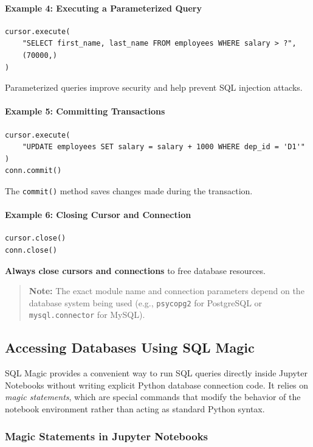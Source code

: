 \documentclass{article}
\begin{document}
\paragraph{Example 4: Executing a Parameterized Query}
\begin{verbatim}
cursor.execute(
    "SELECT first_name, last_name FROM employees WHERE salary > ?",
    (70000,)
)
\end{verbatim}
Parameterized queries improve security and help prevent SQL injection attacks.

\paragraph{Example 5: Committing Transactions}
\begin{verbatim}
cursor.execute(
    "UPDATE employees SET salary = salary + 1000 WHERE dep_id = 'D1'"
)
conn.commit()
\end{verbatim}
The \texttt{commit()} method saves changes made during the transaction.

\paragraph{Example 6: Closing Cursor and Connection}
\begin{verbatim}
cursor.close()
conn.close()
\end{verbatim}
\textbf{Always close cursors and connections} to free database resources.
\begin{quote}
\textbf{Note:} The exact module name and connection parameters depend on the database system being used (e.g., \texttt{psycopg2} for PostgreSQL or \texttt{mysql.connector} for MySQL).
\end{quote}


\subsection{Accessing Databases Using SQL Magic}

SQL Magic provides a convenient way to run SQL queries directly inside Jupyter Notebooks without writing explicit Python database connection code. It relies on \emph{magic statements}, which are special commands that modify the behavior of the notebook environment rather than acting as standard Python syntax.

\subsubsection{Magic Statements in Jupyter Notebooks}
\end{document}
